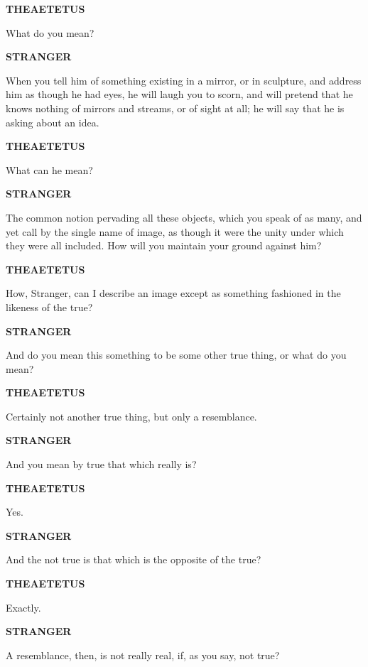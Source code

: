 \documentclass[11pt,letter]{article}
\begin{document}
\par \textbf{THEAETETUS}
\par   What do you mean?

\par \textbf{STRANGER}
\par   When you tell him of something existing in a mirror, or in sculpture, and address him as though he had eyes, he will laugh you to scorn, and will pretend that he knows nothing of mirrors and streams, or of sight at all; he will say that he is asking about an idea.

\par \textbf{THEAETETUS}
\par   What can he mean?

\par \textbf{STRANGER}
\par   The common notion pervading all these objects, which you speak of as many, and yet call by the single name of image, as though it were the unity under which they were all included. How will you maintain your ground against him?

\par \textbf{THEAETETUS}
\par   How, Stranger, can I describe an image except as something fashioned in the likeness of the true?

\par \textbf{STRANGER}
\par   And do you mean this something to be some other true thing, or what do you mean?

\par \textbf{THEAETETUS}
\par   Certainly not another true thing, but only a resemblance.

\par \textbf{STRANGER}
\par   And you mean by true that which really is?

\par \textbf{THEAETETUS}
\par   Yes.

\par \textbf{STRANGER}
\par   And the not true is that which is the opposite of the true?

\par \textbf{THEAETETUS}
\par   Exactly.

\par \textbf{STRANGER}
\par   A resemblance, then, is not really real, if, as you say, not true?
\end{document}
